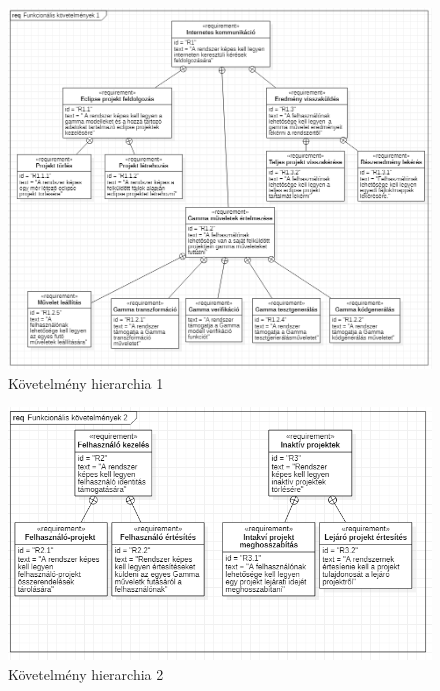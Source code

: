 \begin{figure}[t]
	\includegraphics[width=\textwidth, keepaspectratio]{figures/requierments_placeholder.png}
	\caption{Követelmény hierarchia 1}
	\label{fig:requierments_placeholder}
\end{figure}

\begin{figure}[t]
	\includegraphics[width=150mm, keepaspectratio]{figures/requierments_2.png}
	\caption{Követelmény hierarchia 2}
	\label{fig:requierements_2}
\end{figure}

